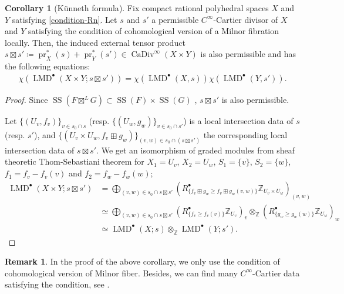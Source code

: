 \documentclass[a4paper,dvipdfmx,reqno,12pt]{amsart}
\theoremstyle{definition}
\newtheorem{corollary}[theorem]{Corollary}
\newtheorem{remark}[theorem]{Remark}
\newcommand{\deq}{\coloneqq}
\newcommand{\Z}{\mathbb{Z}}%
\newcommand{\opn}[1]{\operatorname{#1}}
\numberwithin{equation}{section}
\begin{document}
\begin{corollary}[{K\"unneth formula}]
Fix compact rational polyhedral spaces $X$ and $Y$
satisfying \cref{condition-Rn}.
Let $s$ and $s'$ a permissible $C^{\infty}$-Cartier divisor of $X$ and $Y$ 
satisfying the condition of cohomological version of a Milnor 
fibration \cite[Assumption 1.1.1]{MR2031639} locally.
Then, the induced external tensor product 
$s\boxtimes s'\deq \opn{pr}_X^{*} (s)+\opn{pr}_Y^{*}(s')
\in \opn{CaDiv}^{\infty}(X\times Y)$ is also permissible and
has the following equations:
\begin{align}
\chi(\opn{LMD}^{\bullet}(X\times Y;s\boxtimes s'))=
\chi(\opn{LMD}^{\bullet}(X,s))\chi(\opn{LMD}^{\bullet}(Y,s')).
\end{align}

\end{corollary}
\begin{proof}
Since 
$\opn{SS}(F\boxtimes^{L} G)\subset 
\opn{SS}(F)\times \opn{SS}(G)$
\cite[Proposition 5.4.1]{MR1299726},
$s\boxtimes s'$ is also permissible.

Let $\{(U_v,f_v)\}_{v\in s_0\cap s}$
(resp. $\{(U_w,g_w)\}_{v\in s_0\cap s'}$) is a
local intersection data of $s$ (resp. $s'$), 
and $\{(U_{v}\times U_w,f_v\boxplus g_w)\}_{
(v,w)\in s_0 \cap 
(s\boxtimes s')}$ the 
corresponding local intersection data 
of $s\boxtimes s'$.  
We get an isomorphism of graded modules
from sheaf theoretic Thom-Sebastiani theorem for 
$X_1=U_{v}$, $X_2=U_w$, $S_1=\{v\}$, $S_2=\{w\}$,
$f_1= f_v-f_v(v)$ and 
$f_2= f_w-f_w(w)$;
\begin{align}
\opn{LMD}^{\bullet}(X\times Y;s\boxtimes s') 
& =\bigoplus_{(v,w)\in s_0\cap s\boxtimes s'}
(R^{\bullet}_{\{f_v\boxplus g_w\geq f_v\boxplus g_w(v,w)\}}
\Z_{U_{v}\times U_w})_{(v,w)} \\
& \simeq \bigoplus_{(v,w)\in s_0\cap s\boxtimes s'}
(R^{\bullet}_{\{f_v\geq f_v(v)\}}\Z_{U_v})_v
\otimes_{\Z} (R^{\bullet}_{\{g_w\geq g_w(w)\}}\Z_{U_w})_w \\
& \simeq
\opn{LMD}^{\bullet}(X;s)\otimes_{\Z} 
\opn{LMD}^{\bullet}(Y;s').
\end{align}

\end{proof}

\begin{remark}
In the proof of the above corollary, we only use
the condition of cohomological version of Milnor fiber. 
Besides, we can find many $C^{\infty}$-Cartier data satisfying 
the condition, see \cite[p.35]{MR2031639}.  
\end{remark}
\end{document}
